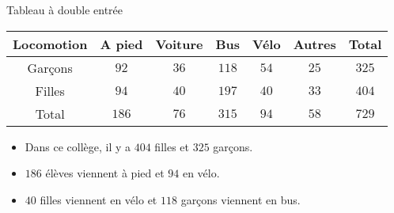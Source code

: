 \begin{pageCours}
\begin{ExT}{Tableau à double entrée}
 \begin{center}
 \begin{tabular}{|c|c|c|c|c|c|c|} \hline
  Locomotion & A pied & Voiture & Bus &  Vélo & Autres & Total \\  \hline
  Garçons & $92$ & $36$ & \textcolor{sacado_orange}{$118$}& $54$ & $25$ & \textcolor{sacado_blue}{$325$} \\\hline
  Filles &  $94$ & $40$ & $197$ & \textcolor{sacado_violet}{$40$}  & $33$ & \textcolor{sacado_green}{$404$} \\\hline
  Total & \textcolor{sacado_gray}{$186$} & $76$ & $315$& \textcolor{sacado_red}{$94$} & $58$ & $729$ \\ \hline
 \end{tabular}
 \end{center}
 
\begin{itemize}
 \item Dans ce collège, il y a \textcolor{sacado_green}{$404$} filles et \textcolor{sacado_blue}{$325$} garçons.
 \item \textcolor{sacado_gray}{$186$} élèves viennent à pied et \textcolor{sacado_red}{$94$} en vélo.
 \item \textcolor{sacado_violet}{$40$} filles viennent en vélo et \textcolor{sacado_orange}{$118$} garçons viennent en bus.
\end{itemize}

\end{ExT}

\end{pageCours}




